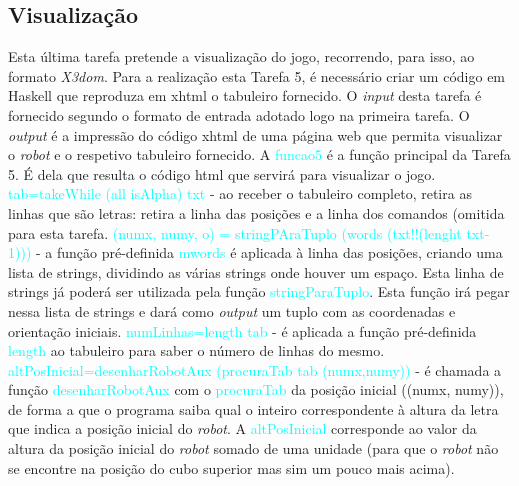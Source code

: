\documentclass[12pt,a4paper]{article}
\begin{document}
\subsection{Visualiza\c{c}ão}
\textsf{ \indent Esta última tarefa pretende a visualiza\c{c}ão do jogo, recorrendo, para isso, ao formato \textit{X3dom}. Para a realiza\c{c}ão esta Tarefa 5, é necessário criar um código em Haskell que reproduza em} xhtml \textsf{ o tabuleiro fornecido.
\newline \indent O \textit{input} desta tarefa é fornecido segundo o formato de entrada adotado logo na primeira tarefa.
\newline \indent O \textit{output} é a impressão do código} xhtml\textsf{ de uma página web que permita visualizar o \textit{robot} e o respetivo tabuleiro fornecido.}
\newline \textsf{ \indent A \textcolor{cyan}{funcao5} é a fun\c{c}ão principal da Tarefa 5. É dela que resulta o código} html \textsf{que servirá para visualizar o jogo.
\newline \indent \textcolor{cyan}{tab=takeWhile (all isAlpha) txt} - ao receber o tabuleiro completo, retira as linhas que são letras: retira a linha das posi\c{c}ões e a linha dos comandos (omitida para esta tarefa.
\newline \indent \textcolor{cyan}{(numx, numy, o) = stringPAraTuplo (words (txt!!(lenght txt-1)))} - a fun\c{c}ão pré-definida \textcolor{cyan}{mwords} é aplicada à linha das posi\c{c}ões, criando uma lista de strings, dividindo as várias strings onde houver um espa\c{c}o. Esta linha de strings já poderá ser utilizada pela fun\c{c}ão \textcolor{cyan}{stringParaTuplo}. Esta fun\c{c}ão irá pegar nessa lista de strings e dará como \textit{output} um tuplo com as coordenadas e orienta\c{c}ão iniciais.
\newline \indent \textcolor{cyan}{numLinhas=length tab} - é aplicada a fun\c{c}ão pré-definida \textcolor{cyan}{length} ao tabuleiro para saber o número de linhas do mesmo.
\newline \indent \textcolor{cyan}{altPosInicial=desenharRobotAux (procuraTab tab (numx,numy))} - é chamada a fun\c{c}ão \textcolor{cyan}{desenharRobotAux} com o \textcolor{cyan}{procuraTab} da posi\c{c}ão inicial ((numx, numy)), de forma a que o programa saiba qual o inteiro correspondente à altura da letra que indica a posi\c{c}ão inicial do \textit{robot}. A \textcolor{cyan}{altPosInicial} corresponde ao valor da altura da posi\c{c}ão inicial do \textit{robot} somado de uma unidade (para que o \textit{robot} não se encontre na posi\c{c}ão do cubo superior mas sim um pouco mais acima).
}
\end{document}
